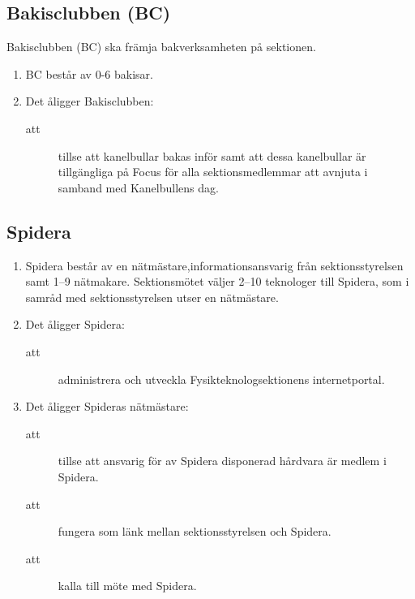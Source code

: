 \documentclass[11pt,a4paper]{article}
\begin{document}
\subsection{Bakisclubben (BC)}
Bakisclubben (BC) ska främja bakverksamheten på sektionen.
\begin{enumerate}[\thesubsection .1]

  \item BC består av 0-6 bakisar.
  
  \item Det åligger Bakisclubben:
    \begin{description}
        \item[att] tillse att kanelbullar bakas inför samt att dessa kanelbullar är tillgängliga på Focus för alla sektionsmedlemmar att avnjuta i samband med Kanelbullens dag.
    \end{description}

\end{enumerate}

\subsection{Spidera}

\begin{enumerate}[\thesubsection .1]

  \item Spidera består av en nätmästare,informationsansvarig från sektionsstyrelsen samt 1--9
  nätmakare. Sektionsmötet väljer 2--10 teknologer till
  Spidera, som i samråd med sektionsstyrelsen utser en nätmästare.

  \item Det åligger Spidera:
    \begin{description}
      \item[att] administrera och utveckla Fysikteknologsektionens internetportal.
    \end{description}

  \item Det åligger Spideras nätmästare:
    \begin{description}
      \item[att] tillse att ansvarig för av Spidera disponerad hårdvara är medlem i Spidera.
      \item[att] fungera som länk mellan sektionsstyrelsen och Spidera.
      \item[att] kalla till möte med Spidera.
    \end{description}


\end{enumerate}
\end{document}
